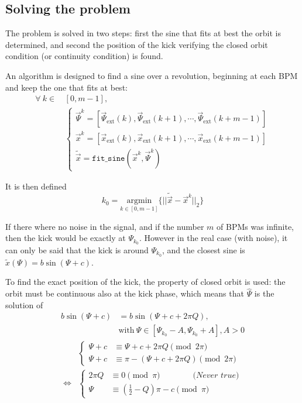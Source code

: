 \subsection{Solving the problem}

The problem is solved in two steps: first the sine that fits at best the orbit is determined, and second the position of the kick verifying the closed orbit condition (or continuity condition) is found.

An algorithm is designed to find a sine over a revolution, beginning at each BPM and keep the one that fits at best:
\begin{align}
\forall~k \in \, &[0,m-1], \nonumber \\
&\begin{cases}
\vec{\Psi}^k = [\vec{\Psi}_\mathrm{ext}(k), \vec{\Psi}_\mathrm{ext}(k+1), \cdots,  \vec{\Psi}_\mathrm{ext}(k+m-1)]\\
\vec{x}^k = [\vec{x}_\mathrm{ext}(k), \vec{x}_\mathrm{ext}(k+1), \cdots,  \vec{x}_\mathrm{ext}(k+m-1)]\\
\tilde{\vec{x}} = \mathtt{fit\_sine}(\vec{x}^k, \vec{\Psi}^k)
\end{cases}
\end{align}

It is then defined
\begin{equation}
k_0 = \underset{k \in [0, m-1]}{\textrm{argmin}}\{||\tilde{\vec{x}}-\vec{x}^k||_2\}
\end{equation}

If there where no noise in the signal, and if the number $m$ of BPMs was infinite, then the kick would be exactly at $\Psi_{k_0}$. However in the real case (with noise), it can only be said that the kick is around $\Psi_{k_0}$, and the closest sine is $\tilde{x}(\Psi) = b \sin(\Psi + c)$. 

To find the exact position of the kick, the property of closed orbit is used: the orbit must be continuous also at the kick phase, which means that $\hat{\Psi}$ is the solution of
\begin{align}
b \sin(\Psi + c) &= b\sin(\Psi+c+2 \pi Q),\\
& \mathrm{with}~ \Psi \in [\Psi_{k_0}-A, \Psi_{k_0}+A] , A>0 \nonumber
\end{align}
\begin{align}
&\begin{cases}
\Psi + c &\equiv \Psi + c + 2 \pi Q \pmod{2 \pi} \\
\Psi + c &\equiv \pi - (\Psi + c + 2 \pi Q) \pmod{2 \pi}
\end{cases} \nonumber\\
\iff &\begin{cases} 
2 \pi Q &\equiv 0\pmod \pi \qquad\qquad\textit{(Never true)}\\
\Psi &\equiv \left(\frac{1}{2} - Q\right) \pi - c \pmod \pi
\end{cases} \nonumber
\end{align}

